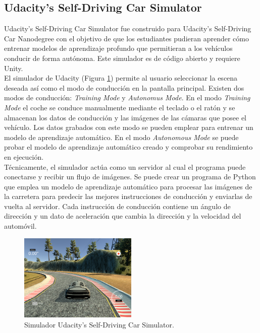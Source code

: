 \subsection{Udacity's Self-Driving Car Simulator}

Udacity's Self-Driving Car Simulator \cite{udacity-data} \cite{udacity-sim} fue construido para Udacity's Self-Driving Car Nanodegree con el objetivo de que los estudiantes pudieran aprender cómo entrenar modelos de aprendizaje profundo que permitieran a los vehículos conducir de forma autónoma. Este simulador es de código abierto y requiere Unity.\\

El simulador de Udacity (Figura \ref{fig.udacity-sim}) permite al usuario seleccionar la escena deseada así como el modo de conducción en la pantalla principal. Existen dos modos de conducción: \textit{Training Mode} y \textit{Autonomus Mode}. En el modo \textit{Training Mode} el coche se conduce manualmente mediante el teclado o el ratón y se almacenan los datos de conducción y las imágenes de las cámaras que posee el vehículo. Los datos grabados con este modo se pueden emplear para entrenar un modelo de aprendizaje automático. En el modo \textit{Autonomous Mode} se puede probar el modelo de aprendizaje automático creado y comprobar su rendimiento en ejecución.\\

Técnicamente, el simulador actúa como un servidor al cual el programa puede conectarse y recibir un flujo de imágenes. Se puede crear un programa de Python que emplea un modelo de aprendizaje automático para procesar las imágenes de la carretera para predecir las mejores instrucciones de conducción y enviarlas de vuelta al servidor. Cada instrucción de conducción contiene un ángulo de dirección y un dato de aceleración que cambia la dirección y la velocidad del automóvil.

\begin{figure}
\begin{center}
	\includegraphics[width=0.5\textwidth]{figures/Estado_arte/udacity.png}
   \caption{Simulador Udacity's Self-Driving Car Simulator.}
	\label{fig.udacity-sim}
\end{center}
\end{figure}


